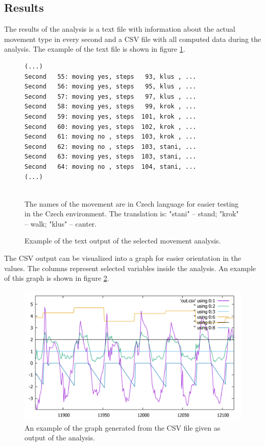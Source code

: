 \subsection{Results}
The results of the analysis is a text file with information about the actual movement type in every second and a \ac{CSV} file with all computed data during the analysis. The example of the text file is shown in figure \ref{fig:textOutputAnalysis}.

\begin{figure}
	\centering
	\label{fig:textOutputAnalysis}
	\caption{Example of the text output of the selected movement analysis.}
	\begin{verbatim}
(...)
Second   55: moving yes, steps   93, klus , ...
Second   56: moving yes, steps   95, klus , ...
Second   57: moving yes, steps   97, klus , ...
Second   58: moving yes, steps   99, krok , ...
Second   59: moving yes, steps  101, krok , ...
Second   60: moving yes, steps  102, krok , ...
Second   61: moving no , steps  103, krok , ...
Second   62: moving no , steps  103, stani, ...
Second   63: moving yes, steps  103, stani, ...
Second   64: moving no , steps  104, stani, ...
(...)
	\end{verbatim}
	\quad\\The names of the movement are in Czech language for easier testing in the Czech environment. The translation is: "stani" -- stand; "krok" -- walk; "klus" -- canter.
\end{figure}

The \ac{CSV} output can be visualized into a graph for easier orientation in the values. The columns represent selected variables inside the analysis. An example of this graph is shown in figure \ref{fig:graphSelectedAnalysis}.

\begin{figure}
	\centering
	\label{fig:graphSelectedAnalysis}
	\caption{An example of the graph generated from the \ac{CSV} file given as output of the analysis.}
	\includegraphics[width=\linewidth]{img/outputHorseAnalysisZoom.pdf}
\end{figure}

